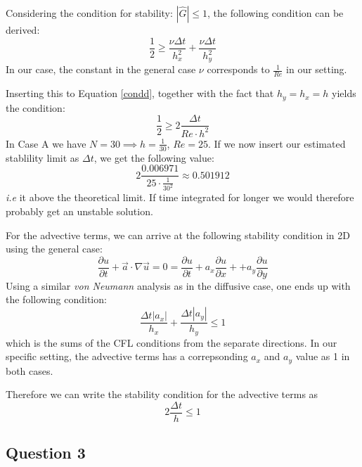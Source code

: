 \documentclass[10pt]{report}
\newcommand{\dt}{\Delta t}
\newcommand{\p}{\partial}
\begin{document}
Considering the condition for stability: $|\hat{G}| \le 1$, the following condition can be derived:
\begin{equation}
    \frac{1}{2} \ge \frac{\nu \dt}{h_x^2} + \frac{\nu \dt}{h_y^2} \label{condd}
\end{equation}
In our case, the constant in the general case $\nu$ corresponds to $\frac{1}{Re}$ in our setting.

Inserting this to Equation \ref{condd}, together with the fact that $h_y = h_x = h$ yields the condition:
\begin{equation}
    \frac{1}{2} \ge 2\frac{\dt}{Re \cdot h^2}
\end{equation}
In Case A we have $N = 30 \implies h = \frac{1}{30}$, $Re = 25$. If we now insert our estimated stablility limit as $\dt$,
we get the following value:
\[
    2\frac{0.006971}{25 \cdot \frac{1}{30^2}} \approx 0.501912
\]
\textit{i.e} it above the theoretical limit. If time integrated for longer we would therefore probably get an unstable solution.

For the advective terms, we can arrive at the following stability condition in 2D using the general case:
\begin{equation*}
    \frac{\p u}{\p t} + \vec{a}\cdot \nabla \vec{u} = 0 = \frac{\p u}{\p t} + a_x \frac{\p u}{\p x} + + a_y \frac{\p u}{\p y}
\end{equation*}
Using a similar \textit{von Neumann} analysis as in the diffusive case, one ends up with the following condition:
\begin{equation}
    \frac{\dt |a_x|}{h_x} + \frac{\dt |a_y|}{h_y} \le 1 
\end{equation}
which is the sums of the CFL conditions from the separate directions. In our specific setting, the advective terms
has a correpsonding $a_x$ and $a_y$ value as 1 in both cases.

Therefore we can write the stability condition for the advective terms as\[
    2\frac{\dt}{h} \le 1
\]
\subsection*{Question 3}
\end{document}
